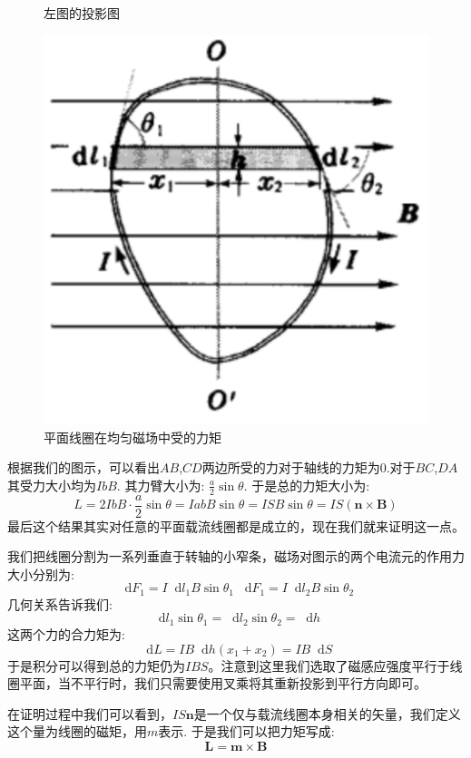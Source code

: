 \documentclass[12pt,a4paper,oneside]{report}
\theoremstyle{definition}
\theoremstyle{remark}
\renewcommand{\d}{\mathop{}\!\mathrm{d}}
\begin{document}
\begin{figure}[h]
\begin{minipage}[t]{0.3\textwidth}
    \caption{左图的投影图}
  \end{minipage}
  \hfill
  \begin{minipage}[t]{0.3\textwidth}
    \centering
    \includegraphics[width=\textwidth]{2-13.png}
    \caption{平面线圈在均匀磁场中受的力矩}
  \end{minipage}
\end{figure}

根据我们的图示，可以看出$AB$,$CD$两边所受的力对于轴线的力矩为$0$.对于$BC$,$DA$其受力大小均为$IbB$. 其力臂大小为:
$\frac{a}{2}\sin\theta$. 于是总的力矩大小为:
\[
L = 2IbB\cdot \frac{a}{2}\sin\theta = IabB\sin\theta = ISB\sin\theta = IS (\mathbf{n}\times \mathbf{B})
\]
最后这个结果其实对任意的平面载流线圈都是成立的，现在我们就来证明这一点。

我们把线圈分割为一系列垂直于转轴的小窄条，磁场对图示的两个电流元的作用力大小分别为:
\[
\d F_1 = I\d l_1 B\sin\theta_1 \;\d F_1 = I\d l_2 B\sin\theta_2
\]
几何关系告诉我们:
\[
\d l_1 \sin\theta_1 =\d l_2 \sin\theta_2 = \d h
\]
这两个力的合力矩为:
\[
\d L = IB\d h(x_1+x_2) = I B \d S
\]
于是积分可以得到总的力矩仍为$IBS$。注意到这里我们选取了磁感应强度平行于线圈平面，当不平行时，我们只需要使用叉乘将其重新投影到平行方向即可。

在证明过程中我们可以看到，$IS\mathbf{n}$是一个仅与载流线圈本身相关的矢量，我们定义这个量为线圈的磁矩，用$m$表示. 于是我们可以把力矩写成:
\[
\mathbf{L} = \mathbf{m} \times \mathbf{B}
\]
\end{document}
